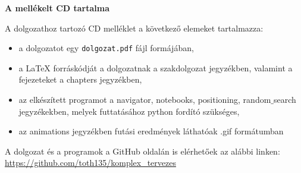 \pagestyle{empty}

\noindent \textbf{\Large A mellékelt CD tartalma}

\vskip 1cm

A dolgozathoz tartozó CD melléklet a következő elemeket tartalmazza:

\begin{itemize}
\item a dolgozatot egy \texttt{dolgozat.pdf} fájl formájában,
\item a LaTeX forráskódját a dolgozatnak a szakdolgozat jegyzékben, valamint a fejezeteket a chapters jegyzékben,
\item az elkészített programot a navigator, notebooks, positioning, random$\_$search jegyzékekben, melyek futtatásához python fordító szükséges,
\item az animations jegyzékben futási eredmények láthatóak .gif formátumban
\end{itemize}

A dolgozat és a programok a GitHub oldalán is elérhetőek az alábbi linken:\\
\url{https://github.com/toth135/komplex_tervezes}
